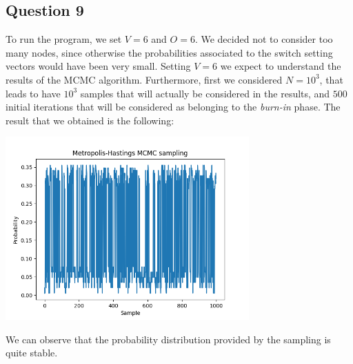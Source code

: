 \documentclass[]{article}
\begin{document}
\subsection*{Question 9}
To run the program, we set $V=6$ and $O=6$. We decided not to consider too many nodes, since otherwise the probabilities associated to the switch setting vectors would have been very small. Setting $V=6$ we expect to understand the results of the MCMC algorithm. Furthermore, first we considered $N=10^3$, that leads to have $10^3$ samples that will actually be considered in the results, and $500$ initial iterations that will be considered as belonging to the \emph{burn-in} phase. The result that we obtained is the following:
\begin{center}
	\includegraphics[height=7cm]{task3/V_6_T_6_N_1000.png}
\end{center}
We can observe that the probability distribution provided by the sampling is quite stable.
\end{document}
